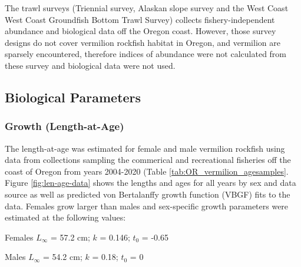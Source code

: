 \documentclass[11pt,
  english,
  a4paper,
]{article}
\begin{document}
The trawl surveys (Triennial survey, Alaskan slope survey and the West Coast West Coast Groundfish Bottom Trawl Survey) collects fishery-independent abundance and biological data off the Oregon coast. However, those survey designs do not cover vermilion rockfish habitat in Oregon, and vermilion are sparsely encountered, therefore indices of abundance were not calculated from these survey and biological data were not used.

\leavevmode\tagmcend\tagstructend\par


\hypertarget{biological-parameters}{%
\subsection{Biological Parameters}\label{biological-parameters}}

\leavevmode\tagmcend\tagstructend


\hypertarget{growth-length-at-age}{%
\subsubsection{Growth (Length-at-Age)}\label{growth-length-at-age}}

\leavevmode\tagmcend\tagstructend


The length-at-age was estimated for female and male vermilion rockfish using data from collections sampling the commerical and recreational fisheries off the coast of Oregon from years 2004-2020 (Table \ref{tab:OR_vermilion_agesamples}. Figure \ref{fig:len-age-data} shows the lengths and ages for all years by sex and data source as well as predicted von Bertalanffy growth function (VBGF) fits to the data. Females grow larger than males and sex-specific growth parameters were estimated at the following values:

\leavevmode\tagmcend\tagstructend\par

\begin{centering}

Females $L_{\infty}$ = 57.2 cm; $k$ = 0.146; $t_0$ = -0.65

Males $L_{\infty}$ = 54.2 cm; $k$ = 0.18; $t_0$ = 0

\end{centering}
\end{document}
